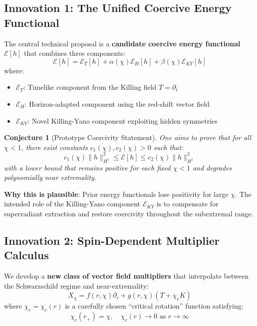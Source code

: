 \documentclass[12pt,a4paper]{article}
\newtheorem{conjecture}[theorem]{Conjecture}
\begin{document}
\subsection{Innovation 1: The Unified Coercive Energy Functional}

The central technical proposal is a \textbf{candidate coercive energy functional} $\mathcal{E}[h]$ that combines three components:
\begin{equation}
\mathcal{E}[h] = \mathcal{E}_T[h] + \alpha(\chi)\mathcal{E}_H[h] + \beta(\chi)\mathcal{E}_{KY}[h]
\end{equation}
where:
\begin{itemize}
    \item $\mathcal{E}_T$: Timelike component from the Killing field $T = \partial_t$
    \item $\mathcal{E}_H$: Horizon-adapted component using the red-shift vector field
    \item $\mathcal{E}_{KY}$: Novel Killing-Yano component exploiting hidden symmetries
\end{itemize}

\begin{conjecture}[Prototype Coercivity Statement]\label{thm:coercivity}
One aims to prove that for all $\chi < 1$, there exist constants $c_1(\chi), c_2(\chi) > 0$ such that:
\begin{equation}
c_1(\chi)\|h\|_{H^1}^2 \leq \mathcal{E}[h] \leq c_2(\chi)\|h\|_{H^1}^2
\end{equation}
with a lower bound that remains positive for each fixed $\chi<1$ and degrades polynomially near extremality.
\end{conjecture}

\textbf{Why this is plausible}: Prior energy functionals lose positivity for large $\chi$. The intended role of the Killing-Yano component $\mathcal{E}_{KY}$ is to compensate for superradiant extraction and restore coercivity throughout the subextremal range.

\subsection{Innovation 2: Spin-Dependent Multiplier Calculus}

We develop a \textbf{new class of vector field multipliers} that interpolate between the Schwarzschild regime and near-extremality:
\begin{equation}
X_\chi = f(r,\chi)\partial_r + g(r,\chi)(T + \chi_c K)
\end{equation}
where $\chi_c = \chi_c(r)$ is a carefully chosen ``critical rotation'' function satisfying:
\begin{equation}
\chi_c(r_+) = \chi, \quad \chi_c(r) \to 0 \text{ as } r \to \infty
\end{equation}
\end{document}
